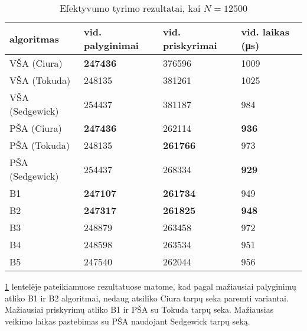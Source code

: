 \documentclass{VUMIFInfKursinis}
\begin{document}
\begin{table}[H]
  \caption{Efektyvumo tyrimo rezultatai, kai $N = 12500$}
  \label{results_12500}
  \centering
  \begin{tabular}{llll}
    algoritmas & vid. palyginimai                        & vid. priskyrimai                        & vid. laikas (μs)                     \\ \midrule
    VŠA (Ciura)       & \cellcolor[HTML]{70AD47}\textbf{247436} & 376596                                  & 1009                                 \\
    VŠA (Tokuda)      & 248135                                  & 381261                                  & 1025                                 \\
    VŠA (Sedgewick)       & 254437                                  & 381187                                  & 984                                  \\
    PŠA (Ciura)      & \cellcolor[HTML]{70AD47}\textbf{247436} & 262114                                  & \cellcolor[HTML]{70AD47}\textbf{936} \\
    PŠA (Tokuda)      & 248135                                  & \cellcolor[HTML]{70AD47}\textbf{261766} & 973                                  \\
    PŠA (Sedgewick)      & 254437                                  & 268334                                  & \cellcolor[HTML]{70AD47}\textbf{929} \\
    B1      & \cellcolor[HTML]{70AD47}\textbf{247107} & \cellcolor[HTML]{70AD47}\textbf{261734} & 949                                  \\
    B2 & \cellcolor[HTML]{70AD47}\textbf{247317} & \cellcolor[HTML]{70AD47}\textbf{261825} & \cellcolor[HTML]{70AD47}\textbf{948} \\
    B3      & 248879                                  & 263458                                  & 972                                  \\
    B4      & 248598                                  & 263534                                  & 951                                  \\
    B5      & 247540                                  & 262044                                  & 956                                  \\ \bottomrule       
  \end{tabular}
\end{table}

\ref{results_12500} lentelėje pateikiamuose rezultatuose matome, kad
pagal mažiausiai palyginimų atliko B1 ir B2 algoritmai, nedaug atsiliko Ciura tarpų seka paremti variantai.
Mažiausiai priskyrimų atliko B1 ir PŠA su Tokuda tarpų seka.
Mažiausias veikimo laikas pastebimas su PŠA naudojant Sedgewick tarpų seką.
\end{document}
